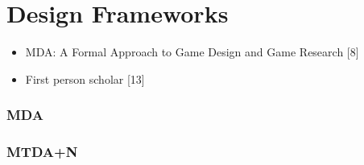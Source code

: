 \section{Design Frameworks}
\begin{itemize}
    \item MDA: A Formal Approach to Game Design and Game Research [8] \cite{Hunicke2004}
    \item First person scholar [13] \cite{Ralph2014}
\end{itemize}

\subsubsection{MDA}

\subsubsection{MTDA+N}